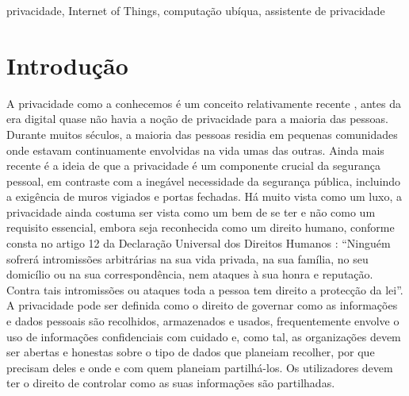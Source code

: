 \documentclass[conference]{IEEEtran}
\begin{document}
\begin{IEEEkeywords}
privacidade, Internet of Things, computação ubíqua, assistente de privacidade

\end{IEEEkeywords}

\section{Introdução}

A privacidade como a conhecemos é um conceito relativamente recente \cite{vincent2016privacy, moore2017privacy},
antes da era digital quase não havia a noção de privacidade para a maioria
das pessoas. Durante muitos séculos, a maioria das pessoas residia em pequenas
comunidades onde estavam continuamente envolvidas na vida umas das outras.
Ainda mais recente é a ideia de que a privacidade é um componente crucial da
segurança pessoal, em contraste com a inegável necessidade da segurança pública,
incluindo a exigência de muros vigiados e portas fechadas. Há muito vista
como um luxo, a privacidade ainda costuma ser vista como um bem de se ter
e não como um requisito essencial, embora seja reconhecida como um direito
humano, conforme consta no artigo 12 da Declaração Universal dos Direitos
Humanos \cite{RooseveltUniversal}: ``Ninguém sofrerá intromissões arbitrárias
na sua vida privada, na sua família, no seu domicílio ou na sua correspondência,
nem ataques à sua honra e reputação. Contra tais intromissões ou ataques
toda a pessoa tem direito a protecção da lei''. A privacidade pode ser definida
\cite{InternationalWhat, SpiekermannEngineering} como o direito de governar
como as informações e dados pessoais são recolhidos, armazenados e usados,
frequentemente envolve o uso de informações confidenciais com cuidado e, como
tal, as organizações devem ser abertas e honestas sobre o tipo de dados que
planeiam recolher, por que precisam deles e onde e com quem planeiam
partilhá-los. Os utilizadores devem ter o direito de controlar como as suas
informações são partilhadas.
\end{document}
